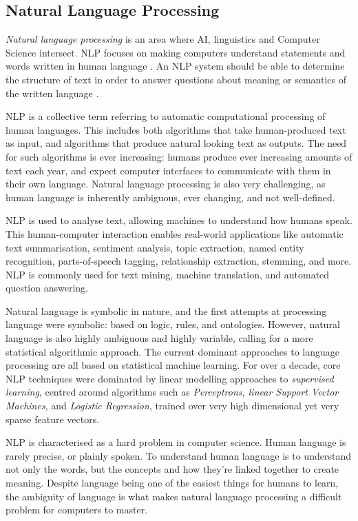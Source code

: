 \documentclass[12pt,a4paper]{article}
\begin{document}
\subsection{Natural Language Processing}
\textit{Natural language processing} is an area where AI, linguistics and Computer Science intersect. NLP focuses on making computers understand statements and words written in human language \cite{Khurana2017}. An NLP system should be able to determine the structure of text in order to answer questions about meaning or semantics of the written language \cite{Martinez2010}.

NLP is a collective term referring to automatic computational processing of human languages. This includes both algorithms that take human-produced text as input, and algorithms that produce natural looking text as outputs. The need for such algorithms
is ever increasing: humans produce ever increasing amounts of text each year, and expect computer interfaces to communicate with them in their own language. Natural language processing is also very challenging, as human language is inherently ambiguous, ever changing, and not well-defined.

NLP is used to analyse text, allowing machines to understand how humans speak. This human-computer interaction enables real-world applications like automatic text summarisation, sentiment analysis, topic extraction, named entity recognition, parts-of-speech tagging, relationship extraction, stemming, and more. NLP is commonly used for text mining, machine translation, and automated question answering.

Natural language is symbolic in nature, and the first attempts at processing language were symbolic: based on logic, rules, and ontologies. However, natural language is also highly ambiguous and highly variable, calling for a more statistical algorithmic approach. The current dominant approaches to language processing are all based on statistical machine learning. For
over a decade, core NLP techniques were dominated by linear modelling approaches to \textit{supervised learning}, centred around algorithms such as \textit{Perceptrons, linear Support Vector Machines}, and \textit{Logistic Regression}, trained over very high dimensional yet very sparse feature vectors.

NLP is characterised as a hard problem in computer science. Human language is rarely precise, or plainly spoken. To understand human language is to understand not only the words, but the concepts and how they’re linked together to create meaning. Despite language being one of the easiest things for humans to learn, the ambiguity of language is what makes natural language processing a difficult problem for computers to master.
\end{document}
